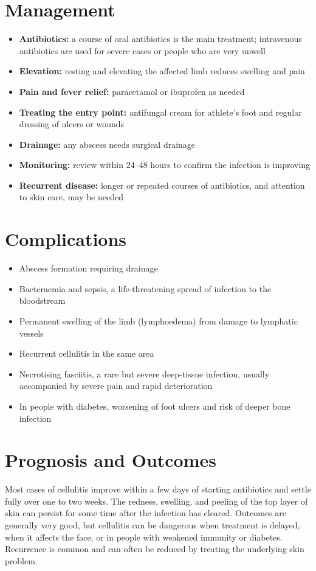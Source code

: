 \section*{Management}
\begin{itemize}
    \item \textbf{Antibiotics:} a course of oral antibiotics is the main treatment; intravenous antibiotics are used for severe cases or people who are very unwell
    \item \textbf{Elevation:} resting and elevating the affected limb reduces swelling and pain
    \item \textbf{Pain and fever relief:} paracetamol or ibuprofen as needed
    \item \textbf{Treating the entry point:} antifungal cream for athlete's foot and regular dressing of ulcers or wounds
    \item \textbf{Drainage:} any abscess needs surgical drainage
    \item \textbf{Monitoring:} review within 24--48 hours to confirm the infection is improving
    \item \textbf{Recurrent disease:} longer or repeated courses of antibiotics, and attention to skin care, may be needed
\end{itemize}

\section*{Complications}
\begin{itemize}
    \item Abscess formation requiring drainage
    \item Bacteraemia and sepsis, a life-threatening spread of infection to the bloodstream
    \item Permanent swelling of the limb (lymphoedema) from damage to lymphatic vessels
    \item Recurrent cellulitis in the same area
    \item Necrotising fasciitis, a rare but severe deep-tissue infection, usually accompanied by severe pain and rapid deterioration
    \item In people with diabetes, worsening of foot ulcers and risk of deeper bone infection
\end{itemize}

\section*{Prognosis and Outcomes}
Most cases of cellulitis improve within a few days of starting antibiotics and settle fully over one to two weeks. The redness, swelling, and peeling of the top layer of skin can persist for some time after the infection has cleared. Outcomes are generally very good, but cellulitis can be dangerous when treatment is delayed, when it affects the face, or in people with weakened immunity or diabetes. Recurrence is common and can often be reduced by treating the underlying skin problem.

